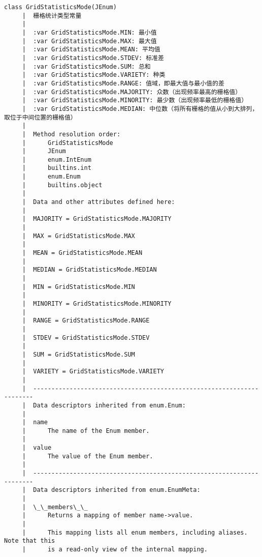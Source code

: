 \documentclass[11pt]{article}
\begin{document}
\begin{Verbatim}[commandchars=\\\{\}]
    class GridStatisticsMode(JEnum)
     |  栅格统计类型常量
     |  
     |  :var GridStatisticsMode.MIN: 最小值
     |  :var GridStatisticsMode.MAX: 最大值
     |  :var GridStatisticsMode.MEAN: 平均值
     |  :var GridStatisticsMode.STDEV: 标准差
     |  :var GridStatisticsMode.SUM: 总和
     |  :var GridStatisticsMode.VARIETY: 种类
     |  :var GridStatisticsMode.RANGE: 值域，即最大值与最小值的差
     |  :var GridStatisticsMode.MAJORITY: 众数（出现频率最高的栅格值）
     |  :var GridStatisticsMode.MINORITY: 最少数（出现频率最低的栅格值）
     |  :var GridStatisticsMode.MEDIAN: 中位数（将所有栅格的值从小到大排列，取位于中间位置的栅格值）
     |  
     |  Method resolution order:
     |      GridStatisticsMode
     |      JEnum
     |      enum.IntEnum
     |      builtins.int
     |      enum.Enum
     |      builtins.object
     |  
     |  Data and other attributes defined here:
     |  
     |  MAJORITY = GridStatisticsMode.MAJORITY
     |  
     |  MAX = GridStatisticsMode.MAX
     |  
     |  MEAN = GridStatisticsMode.MEAN
     |  
     |  MEDIAN = GridStatisticsMode.MEDIAN
     |  
     |  MIN = GridStatisticsMode.MIN
     |  
     |  MINORITY = GridStatisticsMode.MINORITY
     |  
     |  RANGE = GridStatisticsMode.RANGE
     |  
     |  STDEV = GridStatisticsMode.STDEV
     |  
     |  SUM = GridStatisticsMode.SUM
     |  
     |  VARIETY = GridStatisticsMode.VARIETY
     |  
     |  ----------------------------------------------------------------------
     |  Data descriptors inherited from enum.Enum:
     |  
     |  name
     |      The name of the Enum member.
     |  
     |  value
     |      The value of the Enum member.
     |  
     |  ----------------------------------------------------------------------
     |  Data descriptors inherited from enum.EnumMeta:
     |  
     |  \_\_members\_\_
     |      Returns a mapping of member name->value.
     |      
     |      This mapping lists all enum members, including aliases. Note that this
     |      is a read-only view of the internal mapping.
    

\end{Verbatim}
\end{document}

